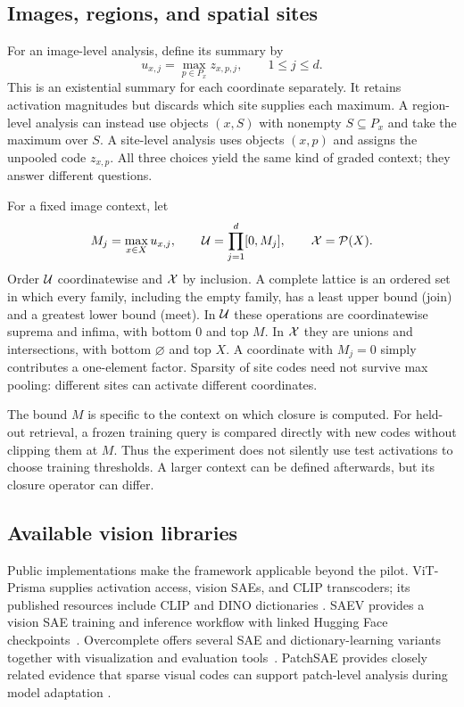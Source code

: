 \subsection{Images, regions, and spatial sites}
\label{sub:spatial-objects}
For an image-level analysis, define its summary by
\begin{equation}\label{eq:max-summary}
  u_{x,j}=\max_{p\in P_{x}}z_{x,p,j},\qquad 1\leq j\leq d.
\end{equation}
This is an existential summary for each coordinate separately. It retains
activation magnitudes but discards which site supplies each maximum.
A region-level analysis can instead use objects $(x,S)$ with nonempty
$S\subseteq P_{x}$ and take the maximum over $S$. A site-level analysis
uses objects $(x,p)$ and assigns the unpooled code $z_{x,p}$. All three
choices yield the same kind of graded context; they answer different
questions.

For a fixed image context, let
\begin{equation}\label{eq:vector-lattice}
  M_{j}=\max_{x\in X}u_{x,j},\qquad
  \mathcal{U}=\prod_{j=1}^{d}[0,M_{j}],\qquad \mathcal{X}=\mathcal{P}(X).
\end{equation}
Order $\mathcal{U}$ coordinatewise and $\mathcal{X}$ by inclusion. A complete lattice is an
ordered set in which every family, including the empty family, has a
least upper bound (join) and a greatest lower bound (meet). In $\mathcal{U}$ these
operations are coordinatewise suprema and infima, with bottom $0$ and
top $M$. In $\mathcal{X}$ they are unions and intersections, with bottom
$\varnothing$ and top $X$. A coordinate with $M_{j}=0$ simply contributes a
one-element factor. Sparsity of site codes need not survive max pooling:
different sites can activate different coordinates.

The bound $M$ is specific to the context on which closure is computed.
For held-out retrieval, a frozen training query is compared directly with
new codes without clipping them at $M$. Thus the experiment does not
silently use test activations to choose training thresholds. A larger
context can be defined afterwards, but its closure operator can differ.

\subsection{Available vision libraries}
\label{sub:libraries}
Public implementations make the framework applicable beyond the pilot.
ViT-Prisma supplies activation access, vision SAEs, and CLIP transcoders;
its published resources include CLIP and DINO dictionaries
\cite{joseph2025prisma,vitprisma}.
SAEV provides a vision SAE training and inference workflow with linked
Hugging Face checkpoints~\cite{saev,stevens2025vision}.
Overcomplete offers several SAE and dictionary-learning variants together
with visualization and evaluation tools~\cite{overcomplete}.
PatchSAE provides closely related evidence that sparse visual codes can
support patch-level analysis during model adaptation
\cite{lim2025patchsae}.

